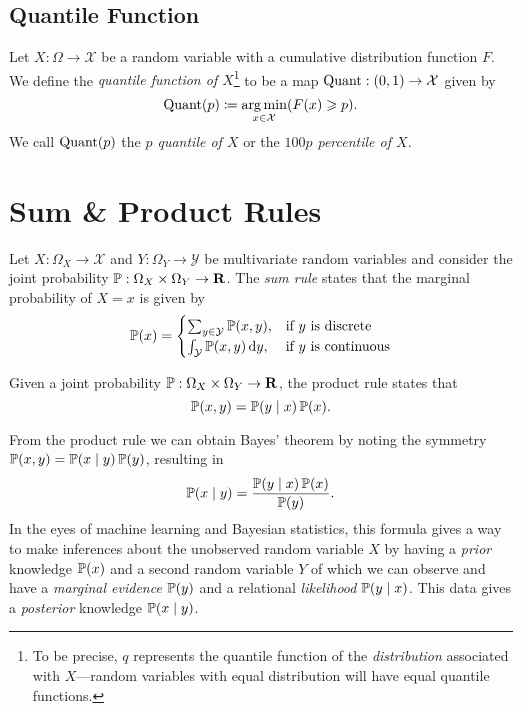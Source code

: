 \subsection{Quantile Function}

\begin{definition}
\label{def:quantile-percentile}
Let \(X: \Omega \to \mathcal{X}\) be a random variable with a cumulative
distribution function \(F\). We define the \emph{quantile function of
  \(X\)}\footnote{To be precise, \(q\) represents the quantile function of the
  \emph{distribution} associated with \(X\)---random variables with equal
  distribution will have equal quantile functions.} to be a map
\(\operatorname{Quant}: (0, 1) \to \mathcal{X}\) given by
\[
\operatorname{Quant}(p) \coloneq \operatorname*{arg\,min}_{x \in \mathcal{X}} (F(x) \geqslant p).
\]
We call \(\operatorname{Quant}(p)\) the \emph{\(p\) quantile of \(X\)} or the
\emph{\(100 p\) percentile of \(X\)}.
\end{definition}

\section{Sum \& Product Rules}

\begin{lemma}
\label{lem:joint-probability-sum-rule}
Let \(X: \Omega_X \to \mathcal{X}\) and \(Y: \Omega_Y \to \mathcal{Y}\) be
multivariate random variables and consider the joint probability
\(\operatorname{\mathbb{P}}: \Omega_X \times \Omega_Y \to \mathbf{R}\). The \emph{sum rule}
states that the marginal probability of \(X = x\) is given by
\[
\operatorname{\mathbb{P}}(x) =
\begin{cases}
  \sum_{y \in \mathcal{Y}} \operatorname{\mathbb{P}}(x, y), &\text{if } y \text{ is discrete} \\
  \int_{\mathcal{Y}} \operatorname{\mathbb{P}}(x, y)\, \mathrm{d} y, &\text{if } y \text{ is continuous}
\end{cases}
\]
\end{lemma}

\begin{lemma}
\label{lem:joint-probability-product-rule}
Given a joint probability \(\operatorname{\mathbb{P}}: \Omega_X \times \Omega_Y \to \mathbf{R}\), the product
rule states that
\[
\operatorname{\mathbb{P}}(x, y) = \operatorname{\mathbb{P}}(y \mid x) \operatorname{\mathbb{P}}(x).
\]
\end{lemma}

From the product rule we can obtain Bayes' theorem by noting the symmetry
\(\operatorname{\mathbb{P}}(x, y) = \operatorname{\mathbb{P}}(x \mid y) \operatorname{\mathbb{P}}(y)\), resulting in
\[
\operatorname{\mathbb{P}}(x \mid y) = \frac{\operatorname{\mathbb{P}}(y \mid x) \operatorname{\mathbb{P}}(x)}{\operatorname{\mathbb{P}}(y)}.
\]
In the eyes of machine learning and Bayesian statistics, this formula gives a
way to make inferences about the unobserved random variable \(X\) by having a
\emph{prior} knowledge \(\operatorname{\mathbb{P}}(x)\) and a second random variable \(Y\) of which we
can observe and have a \emph{marginal evidence} \(\operatorname{\mathbb{P}}(y)\) and a relational
\emph{likelihood} \(\operatorname{\mathbb{P}}(y \mid x)\). This data gives a \emph{posterior} knowledge
\(\operatorname{\mathbb{P}}(x \mid y)\).

